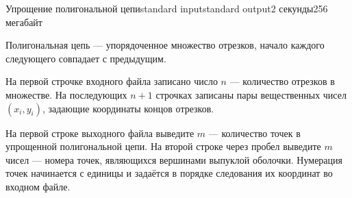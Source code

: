 \begin{problem}{Упрощение полигональной цепи}{standard input}{standard output}{2 секунды}{256 мегабайт}

Полигональная цепь — упорядоченное множество отрезков, начало каждого следующего совпадает с предыдущим.

\InputFile

На первой строчке входного файла записано число $n$ — количество отрезков в множестве.
На последующих $n + 1$ строчках записаны пары вещественных чисел $(x_i, y_i)$, задающие координаты концов отрезков.

\OutputFile

На первой строке выходного файла выведите $m$ — количество точек в упрощенной полигональной цепи.
На второй строке через пробел выведите $m$ чисел — номера точек, являющихся вершинами выпуклой оболочки.
Нумерация точек начинается с единицы и задаётся в порядке следования их координат во входном файле.

\Examples

\begin{example}%
%
\end{example}

\end{problem}